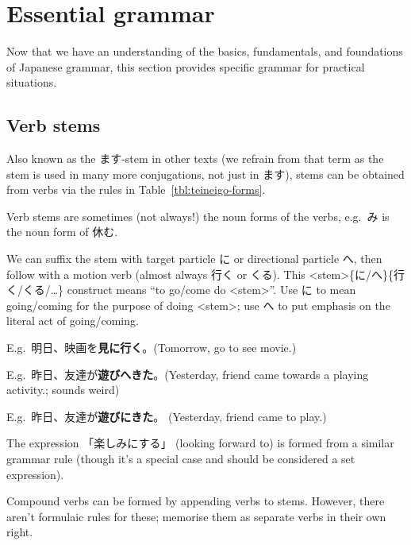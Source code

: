 \documentclass[../nihongo-gakushuu-kyouzai.tex]{subfiles}
\begin{document}
\setcounter{section}{2}
\section{Essential grammar} \label{sec:essential-grammar}

Now that we have an understanding of the basics, fundamentals, and foundations of Japanese grammar, this section provides specific grammar for practical situations.

\subsection{Verb stems} \label{sec:verb-stems}



Also known as the ます-stem in other texts (we refrain from that term as the stem is used in many more conjugations, not just in ます), stems can be obtained from verbs via the rules in Table~\ref{tbl:teineigo-forms}.

Verb stems are sometimes (not always!) the noun forms of the verbs, e.g.\ み is the noun form of 休む.

We can suffix the stem with target particle に or directional particle へ, then follow with a motion verb (almost always 行く or くる). This <stem>\{に/へ\}\{行く/くる/\dots\} construct means ``to go/come do <stem>''. Use に to mean going/coming for the purpose of doing <stem>; use へ to put emphasis on the literal act of going/coming.

E.g.\ 明日、映画を\textbf{見に行く}。(Tomorrow, go to see movie.)

E.g.\ 昨日、友達が\textbf{遊びへきた}。(Yesterday, friend came towards a playing activity.; sounds weird)

E.g.\ 昨日、友達が\textbf{遊びにきた}。 (Yesterday, friend came to play.)

The expression 「楽しみにする」 (looking forward to) is formed from a similar grammar rule (though it's a special case and should be considered a set expression).

Compound verbs can be formed by appending verbs to stems. However, there aren't formulaic rules for these; memorise them as separate verbs in their own right.
\end{document}
